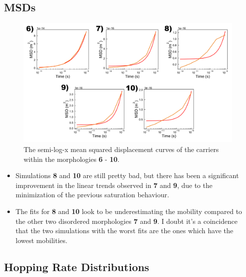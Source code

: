 \documentclass[12pt]{article}
\begin{document}
\subsection{MSDs}

\begin{figure}[h!]\centering
	\includegraphics[width=\textwidth]{Figures/ShrunkMSDHole.pdf}
    \caption{The semi-log-x mean squared displacement curves of the carriers within the morphologies \textbf{6} - \textbf{10}.}
	\label{fig:MSD}
\end{figure}


\begin{itemize}
    \item{Simulations \textbf{8} and \textbf{10} are still pretty bad, but there has been a significant improvement in the linear trends observed in \textbf{7} and \textbf{9}, due to the minimization of the previous saturation behaviour.}
    \item{The fits for \textbf{8} and \textbf{10} look to be underestimating the mobility compared to the other two disordered morphologies \textbf{7} and \textbf{9}. I doubt it's a coincidence that the two simulations with the worst fits are the ones which have the lowest mobilities.}
\end{itemize}


\subsection{Hopping Rate Distributions}
\end{document}
